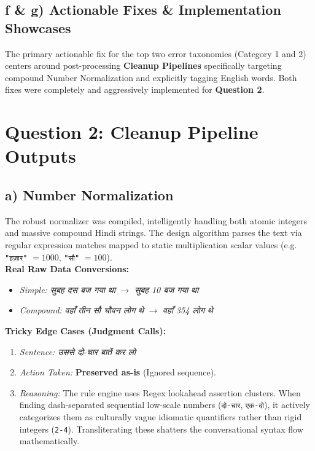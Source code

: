 \documentclass[11pt]{article}
\begin{document}
\subsection*{f \& g) Actionable Fixes \& Implementation Showcases}
The primary actionable fix for the top two error taxonomies (Category 1 and 2) centers around post-processing \textbf{Cleanup Pipelines} specifically targeting compound Number Normalization and explicitly tagging English words. Both fixes were completely and aggressively implemented for \textbf{Question 2}.


\section*{Question 2: Cleanup Pipeline Outputs}
\subsection*{a) Number Normalization}
The robust normalizer was compiled, intelligently handling both atomic integers and massive compound Hindi strings. The design algorithm parses the text via regular expression matches mapped to static multiplication scalar values (e.g. \texttt{"हज़ार"} $= 1000$, \texttt{"सौ"} $= 100$). 
\\
\textbf{Real Raw Data Conversions:}
\begin{itemize}[noitemsep]
    \item \textit{Simple:} \textsl{\texthindi{सुबह दस बज गया था}} $\longrightarrow$ \textsl{\texthindi{सुबह 10 बज गया था}}
    \item \textit{Compound:} \textsl{\texthindi{वहाँ तीन सौ चौवन लोग थे}} $\longrightarrow$ \textsl{\texthindi{वहाँ 354 लोग थे}}
\end{itemize}

\textbf{Tricky Edge Cases (Judgment Calls):}
\begin{enumerate}
    \item \textit{Sentence:} \textsl{\texthindi{उससे दो-चार बातें कर लो}}
    \item \textit{Action Taken:} \textbf{Preserved as-is} (Ignored sequence).
    \item \textit{Reasoning:} The rule engine uses Regex lookahead assertion clusters. When finding dash-separated sequential low-scale numbers (\texttt{दो-चार}, \texttt{एक-दो}), it actively categorizes them as culturally vague idiomatic quantifiers rather than rigid integers (\texttt{2-4}). Transliterating these shatters the conversational syntax flow mathematically.
\end{enumerate}
\end{document}
